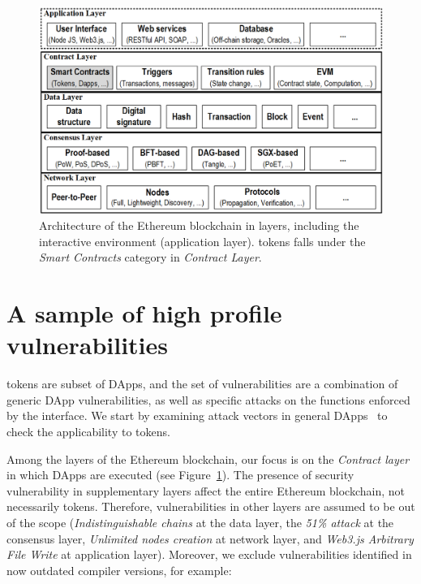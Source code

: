 
\begin{figure}[t!]
	\centering
	\includegraphics[width=1.0\linewidth]{figures/blockchain.png}
	\caption{Architecture of the Ethereum blockchain in layers, including the interactive environment (\ie application layer). \erc tokens falls under the \textit{Smart Contracts} category in \textit{Contract Layer}.}\label{fig:blockchain}
\end{figure}

\section{A sample of high profile vulnerabilities}\label{sec:vul}
\erc tokens are subset of DApps, and the set of \erc vulnerabilities are a combination of generic DApp vulnerabilities, as well as specific attacks on the functions enforced by the \erc interface. We start by examining attack vectors in general DApps~\cite{SolidtySecBlog,EthSecServ,SoliditySecCon,ConsensysSecCon,LandoKL} to check the applicability to \erc tokens.

Among the layers of the Ethereum blockchain, our focus is on the \textit{Contract layer} in which DApps are executed (see Figure~\ref{fig:blockchain}). The presence of security vulnerability in supplementary layers affect the entire Ethereum blockchain, not necessarily \erc tokens. Therefore, vulnerabilities in other layers are assumed to be out of the scope (\eg \textit{Indistinguishable chains} at the data layer, the \textit{51\% attack} at the consensus layer, \textit{Unlimited nodes creation} at network layer, and \textit{Web3.js Arbitrary File Write} at application layer). Moreover, we exclude vulnerabilities identified in now outdated compiler versions, for example:

